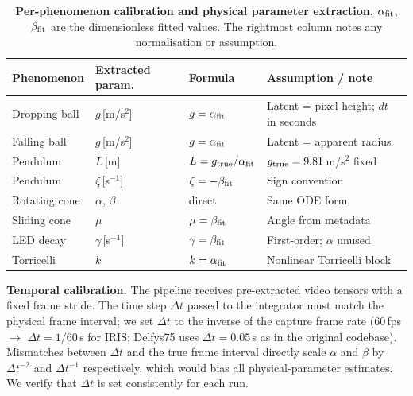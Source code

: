\documentclass[runningheads]{llncs}
\begin{document}
\begin{table}[h]
  \centering
  \caption{\textbf{Per-phenomenon calibration and physical parameter extraction.}
  $\alpha_{\rm fit}$, $\beta_{\rm fit}$ are the dimensionless fitted values.
  The rightmost column notes any normalisation or assumption.}
  \label{tab:calibration}
  \footnotesize
  \setlength{\tabcolsep}{4pt}
  \renewcommand{\arraystretch}{1.2}
  \begin{tabular}{@{}llll@{}}
    \toprule
    \textbf{Phenomenon} & \textbf{Extracted param.} & \textbf{Formula}
      & \textbf{Assumption / note} \\
    \midrule
    Dropping ball   & $g$\,[m/s$^2$]   & $g = \alpha_{\rm fit}$
      & Latent = pixel height; $dt$ in seconds \\
    Falling ball    & $g$\,[m/s$^2$]   & $g = \alpha_{\rm fit}$
      & Latent = apparent radius \\
    Pendulum        & $L$\,[m]          & $L = g_{\rm true}/\alpha_{\rm fit}$
      & $g_{\rm true} = 9.81$\,m/s$^2$ fixed \\
    Pendulum        & $\zeta$\,[s$^{-1}$] & $\zeta = -\beta_{\rm fit}$
      & Sign convention \\
    Rotating cone   & $\alpha$, $\beta$ & direct                  & Same ODE form \\
    Sliding cone    & $\mu$             & $\mu = \beta_{\rm fit}$ & Angle from metadata \\
    LED decay       & $\gamma$\,[s$^{-1}$] & $\gamma = \beta_{\rm fit}$
      & First-order; $\alpha$ unused \\
    Torricelli      & $k$               & $k = \alpha_{\rm fit}$ & Nonlinear Torricelli block \\
    \bottomrule
  \end{tabular}
\end{table}

\textbf{Temporal calibration.} The pipeline receives pre-extracted video
tensors with a fixed frame stride. The time step $\Delta t$ passed to the
integrator must match the physical frame interval; we set $\Delta t$ to the
inverse of the capture frame rate (60\,fps $\to$ $\Delta t = 1/60$\,s for IRIS;
Delfys75 uses $\Delta t = 0.05$\,s as in the original codebase). Mismatches
between $\Delta t$ and the true frame interval directly scale $\alpha$ and
$\beta$ by $\Delta t^{-2}$ and $\Delta t^{-1}$ respectively, which would bias
all physical-parameter estimates. We verify that $\Delta t$ is set consistently
for each run.
\end{document}
